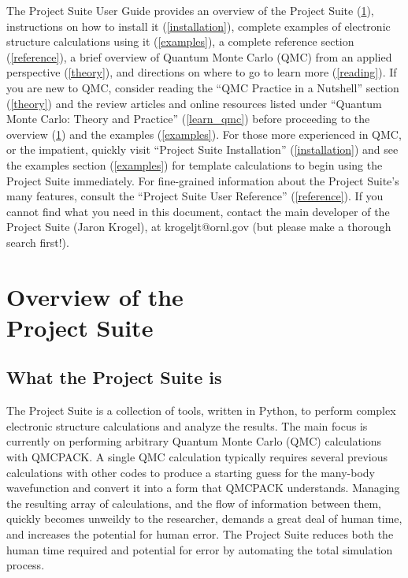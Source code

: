 \documentclass[oneside,11pt]{memoir}
\numberwithin{equation}{section}
\begin{document}
The Project Suite User Guide provides an overview of the Project Suite 
(\ref{overview}), instructions on how to install it (\ref{installation}), 
complete examples of electronic structure calculations using it 
(\ref{examples}), a complete reference section (\ref{reference}), 
a brief overview of Quantum Monte Carlo (QMC) from an applied perspective 
(\ref{theory}), and directions on where to go to learn more (\ref{reading}).  
If you are new to QMC, consider reading the
 ``QMC Practice in a Nutshell'' section (\ref{theory}) and the 
review articles and online resources listed under
 ``Quantum Monte Carlo: Theory and Practice'' (\ref{learn_qmc}) 
before proceeding to the overview (\ref{overview}) and the examples 
(\ref{examples}).  For those more experienced in QMC, or the impatient, 
quickly visit ``Project Suite Installation'' (\ref{installation}) and see the 
examples section (\ref{examples}) for template calculations to begin 
using the Project Suite immediately.  For fine-grained information 
about the Project Suite's many features, consult 
the ``Project Suite User Reference'' (\ref{reference}).
If you cannot find what you need in this document, contact the main 
developer of the Project Suite (Jaron Krogel), at krogeljt@ornl.gov 
(but please make a thorough search first!).



\pagebreak
\chapter{Overview of the \\Project Suite} \label{overview}
\section{What the Project Suite is}
The Project Suite is a collection of tools, written in Python, to perform 
complex electronic structure calculations and analyze the results.  The main 
focus is currently on performing arbitrary Quantum Monte Carlo (QMC) 
calculations with QMCPACK.  A single QMC calculation typically requires several 
previous calculations with other codes to produce a starting guess for the 
many-body wavefunction and convert it into a form that QMCPACK understands.  
Managing the resulting array of calculations, and the flow of information 
between them, quickly becomes unweildy to the researcher, demands a great 
deal of human time, and increases the potential for human error.  The Project 
Suite reduces both the human time required and potential for error by 
automating the total simulation process.  
\end{document}

